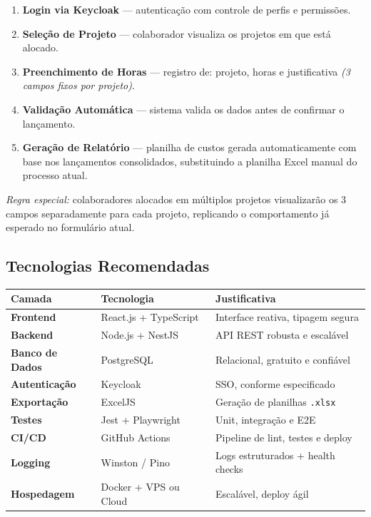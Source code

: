 \documentclass[12pt,a4paper]{article}
\begin{document}
\begin{enumerate}[leftmargin=1.8em]
  \item \textbf{Login via Keycloak} — autenticação com controle de perfis e permissões.
  \item \textbf{Seleção de Projeto} — colaborador visualiza os projetos em que está alocado.
  \item \textbf{Preenchimento de Horas} — registro de: projeto, horas e justificativa
    \textit{(3 campos fixos por projeto)}.
  \item \textbf{Validação Automática} — sistema valida os dados antes de confirmar o lançamento.
  \item \textbf{Geração de Relatório} — planilha de custos gerada automaticamente com base
    nos lançamentos consolidados, substituindo a planilha Excel manual do processo atual.
\end{enumerate}

\textit{Regra especial:} colaboradores alocados em múltiplos projetos visualizarão os 3 campos
separadamente para cada projeto, replicando o comportamento já esperado no formulário atual.

\subsection{Tecnologias Recomendadas}

\begin{tabularx}{\linewidth}{>{\bfseries}lXl}
  \toprule
  Camada & Tecnologia & Justificativa \\
  \midrule
  Frontend       & React.js + TypeScript       & Interface reativa, tipagem segura \\
  Backend        & Node.js + NestJS            & API REST robusta e escalável \\
  Banco de Dados & PostgreSQL                  & Relacional, gratuito e confiável \\
  Autenticação   & Keycloak                    & SSO, conforme especificado \\
  Exportação     & ExcelJS                     & Geração de planilhas \texttt{.xlsx} \\
  Testes         & Jest + Playwright           & Unit, integração e E2E \\
  CI/CD          & GitHub Actions              & Pipeline de lint, testes e deploy \\
  Logging        & Winston / Pino              & Logs estruturados + health checks \\
  Hospedagem     & Docker + VPS ou Cloud       & Escalável, deploy ágil \\
  \bottomrule
\end{tabularx}
\end{document}
